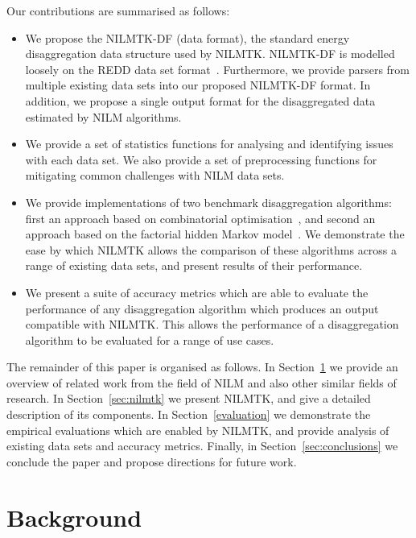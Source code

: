 \documentclass{sig-alternate}
\newcommand{\secref}[1]{Section~\ref{#1}}
\begin{document}
Our contributions are summarised as follows:
\begin{itemize}
\item We propose the NILMTK-DF (data format), the standard energy disaggregation data structure used by NILMTK.  NILMTK-DF is modelled loosely on the REDD data set format~\cite{REDD}. Furthermore, we provide parsers from multiple existing data sets into our proposed NILMTK-DF format. In addition, we propose a single output format for the disaggregated data estimated by NILM algorithms.
\item We provide a set of statistics functions for analysing and identifying issues with each data set.  We also provide a set of preprocessing functions for mitigating common challenges with NILM data sets.
\item We provide implementations of two benchmark disaggregation algorithms: first an approach based on combinatorial optimisation~\cite{hart_1992}, and second an approach based on the factorial hidden Markov model~\cite{REDD,kim_2011}. We demonstrate the ease by which NILMTK allows the comparison of these algorithms across a range of existing data sets, and present results of their performance.
\item We present a suite of accuracy metrics which are able to evaluate the performance of any disaggregation algorithm which produces an output compatible with NILMTK. This allows the performance of a disaggregation algorithm to be evaluated for a range of use cases.
\end{itemize}

The remainder of this paper is organised as follows. In \secref{sec:related} we provide an overview of related work from the field of NILM and also other similar fields of research. In \secref{sec:nilmtk} we present NILMTK, and give a detailed description of its components. In \secref{evaluation} we demonstrate the empirical evaluations which are enabled by NILMTK, and provide analysis of existing data sets and accuracy metrics. Finally, in \secref{sec:conclusions} we conclude the paper and propose directions for future work.

\section{Background}
\label{sec:related}
\end{document}
